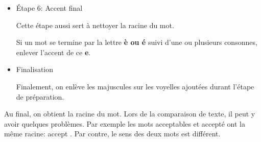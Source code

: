 \begin{itemize}
Les suppressions et remplacements des étapes précédentes peuvent laisser une faute dans la racine du mot.
Cette étape sert à enlever les lettres doubles de certaines finales de mots.

Si un mot se termine par \textbf{enn, onn, ett, ell ou eill}, supprimer la dernière lettre.

\item{Étape 6: Accent final}

Cette étape aussi sert \`a nettoyer la racine du mot.

Si un mot se termine par la lettre \textbf{è ou é} suivi d'une ou plusieurs consonnes, enlever l'accent de ce \textbf{e}.

\item{Finalisation}

Finalement, on enlève les majuscules sur les voyelles ajoutées durant l'étape de préparation.

\end{itemize}

Au final, on obtient la racine du mot.
Lors de la comparaison de texte, il peut y avoir quelques problèmes.
Par exemple les mots \og acceptables \fg{} et \og accepté \fg{} ont la même racine: \og accept \fg{}.
Par contre, le sens des deux mots est différent.
